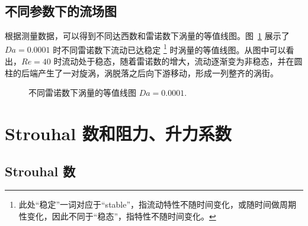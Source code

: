 \subsection{不同参数下的流场图}

根据测量数据，可以得到不同达西数和雷诺数下涡量的等值线图。图~\ref{fig: vorticity contour} 展示了 $Da=0.0001$ 时不同雷诺数下流动已达稳定 \footnote{此处“稳定”一词对应于“stable”，指流动特性不随时间变化，或随时间做周期性变化，因此不同于“稳态”，指特性不随时间变化。} 时涡量的等值线图。从图中可以看出，$Re=40$ 时流动处于稳态，随着雷诺数的增大，流动逐渐变为非稳态，并在圆柱的后端产生了一对旋涡，涡脱落之后向下游移动，形成一列整齐的涡街。


\begin{figure}
	\centering
	\begin{minipage}{\textwidth}
		\centering
	\end{minipage}
	\centering
	\begin{minipage}{\textwidth}
		\centering
	\end{minipage}
	\centering
	\begin{minipage}{\textwidth}
		\centering
	\end{minipage}
	\caption{不同雷诺数下涡量的等值线图 $Da=0.0001$.}
	\label{fig: vorticity contour}
\end{figure}

\section{Strouhal 数和阻力、升力系数}

\subsection{Strouhal 数}

